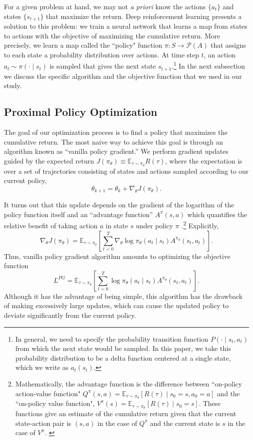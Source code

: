 For a given problem at hand, we may not \textit{a priori} know the actions $\{a_t\}$ and states $\{s_{t+1}\}$ that maximize the return. Deep reinforcement learning presents a solution to this problem: we train a neural network that learns a map from states to actions with the objective of maximizing the cumulative return. More precisely, we learn a map called the ``policy" function $\pi \colon S \to \mathcal{P}(A)$ that assigns to each state a probability distribution over actions. At time step $t$, an action $a_t \sim \pi(\cdot \mid s_t)$ is sampled that gives the next state $s_{t+1}$.\footnote{
In general, we need to specify the probability transition function $P(\cdot \mid s_t, a_t)$ from which the next state would be sampled. In this paper, we take this probability distribution to be a delta function centered at a single state, which we write as $a_t(s_t)$.}
In the next subsection we discuss the specific algorithm and the objective function that we used in our study.

\subsection{Proximal Policy Optimization} \label{sec:ppo}

The goal of our optimization process is to find a policy that maximizes the cumulative return. The most naive way to achieve this goal is through an algorithm known as ``vanilla policy gradient.''
We perform gradient updates guided by the expected return $J(\pi_\theta) \equiv \mathbb{E}_{\tau \sim \pi_\theta} R(\tau)$, where the expectation is over a set of trajectories consisting of states and actions sampled according to our current policy,
\[
\theta_{k+1} = \theta_k + \nabla_\theta J(\pi_\theta).
\]

It turns out that this update depends on the gradient of the logarithm of the policy function itself and an ``advantage function'' \( A^\pi (s, a) \) which quantifies the relative benefit of taking action \( a \) in state \( s \) under policy \( \pi \) \cite{SpinningUp2018}.\footnote{
Mathematically, the advantage function is the difference between ``on-policy action-value function" $Q^{\pi}(s, a) = \mathbb{E}_{\tau \sim \pi_\theta} [R(\tau) \mid s_0 = s, a_0 = a]$ and the ``on-policy value function", $V^{\pi}(s) = \mathbb{E}_{\tau \sim \pi_\theta} [R(\tau) \mid s_0 = s]$.
These functions give an estimate of the cumulative return given that the current state-action pair is $(s, a)$ in the case of $Q^\pi$ and the current state is $s$ in the case of $V^{\pi}$.
\label{ft:advantage}}
Explicitly,
\[
\nabla_\theta J(\pi_\theta) =
\mathbb{E}_{\tau \sim \pi_\theta} \left[ \sum\limits_{t=0}^T \nabla_\theta \log \pi_\theta (a_t \mid s_t) A^{\pi_\theta} (s_t, a_t) \right].
\]
Thus, vanilla policy gradient algorithm amounts to optimizing the objective function
\[
L^{PG} = \mathbb{E}_{\tau \sim \pi_\theta} \left[ \sum\limits_{t=0}^T \log \pi_\theta (a_t \mid s_t) A^{\pi_\theta} (s_t, a_t) \right].
\]
Although it has the advantage of being simple, this algorithm has the drawback of making excessively large updates, which can cause the updated policy to deviate significantly from the current policy.

